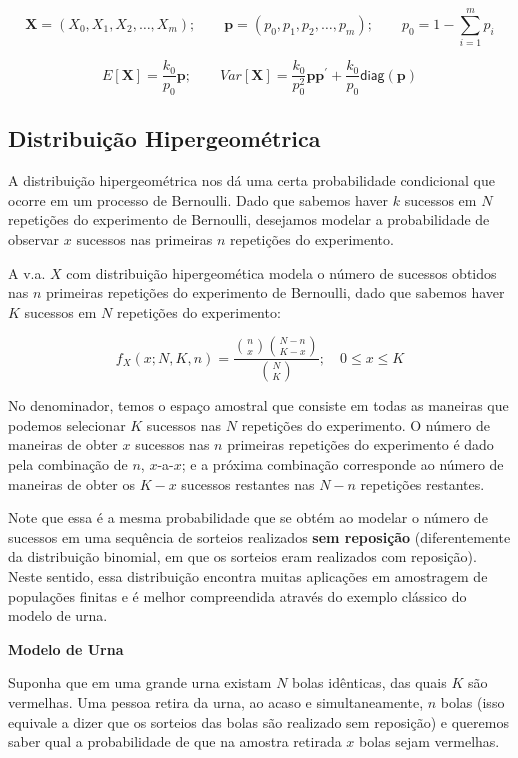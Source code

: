\documentclass[
]{book}
\theoremstyle{definition}
\theoremstyle{definition}
\theoremstyle{definition}
\theoremstyle{remark}
\begin{document}
\[\mathbf{X} = (X_0, X_1, X_2, \ldots, X_m); \qquad %
   \mathbf{p} = (p_0, p_1, p_2, \ldots, p_m); \qquad p_0 = 1 - \sum_{i=1}^m p_i\]

\[E[\mathbf{X}] = \frac{k_0}{p_0} \mathbf{p}; \qquad
    Var[\mathbf{X}] = \frac{k_0}{p_0^2} \mathbf{p}\mathbf{p}^\prime + \frac{k_0}{p_0} \textsf{diag}(\mathbf{p})\]

\hypertarget{distribuiuxe7uxe3o-hipergeomuxe9trica}{%
\subsection*{Distribuição Hipergeométrica}\label{distribuiuxe7uxe3o-hipergeomuxe9trica}}

A distribuição hipergeométrica nos dá uma certa probabilidade condicional que ocorre em um processo de Bernoulli. Dado que sabemos haver \(k\) sucessos em \(N\) repetições do experimento de Bernoulli, desejamos modelar a probabilidade de observar \(x\) sucessos nas primeiras \(n\) repetições do experimento.

A v.a. \(X\) com distribuição hipergeomética modela o número de sucessos obtidos nas \(n\) primeiras repetições do experimento de Bernoulli, dado que sabemos haver \(K\) sucessos em \(N\) repetições do experimento:

\[f_X(x; N, K, n) = \frac{{\binom{n}{x}}{\binom{N-n}{K-x}}}{\binom{N}{K}}; \quad 0 \leq x \leq K\]

No denominador, temos o espaço amostral que consiste em todas as maneiras que podemos selecionar \(K\) sucessos nas \(N\) repetições do experimento. O número de maneiras de obter \(x\) sucessos nas \(n\) primeiras repetições do experimento é dado pela combinação de \(n\), \(x\)-a-\(x\); e a próxima combinação corresponde ao número de maneiras de obter os \(K-x\) sucessos restantes nas \(N-n\) repetições restantes.

Note que essa é a mesma probabilidade que se obtém ao modelar o número de sucessos em uma sequência de sorteios realizados \textbf{sem reposição} (diferentemente da distribuição binomial, em que os sorteios eram realizados com reposição). Neste sentido, essa distribuição encontra muitas aplicações em amostragem de populações finitas e é melhor compreendida através do exemplo clássico do modelo de urna.

\textbf{Modelo de Urna}

Suponha que em uma grande urna existam \(N\) bolas idênticas, das quais \(K\) são vermelhas. Uma pessoa retira da urna, ao acaso e simultaneamente, \(n\) bolas (isso equivale a dizer que os sorteios das bolas são realizado sem reposição) e queremos saber qual a probabilidade de que na amostra retirada \(x\) bolas sejam vermelhas.
\end{document}
